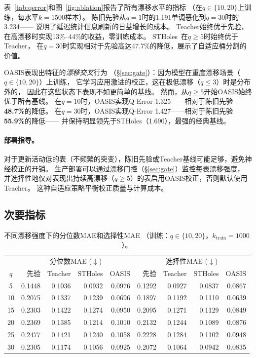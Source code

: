 \documentclass[runningheads]{llncs}
\begin{document}
表~\ref{tab:qerror}和图~\ref{fig:ablation}报告了所有漂移水平的指标
（在$q{\in}\{10,20\}$上训练，每水平$k{=}1500$样本）。
陈旧先验从$q{=}1$时的1.191单调恶化到$q{=}30$时的3.234——
说明了延迟统计信息刷新的日益增长的成本。
Teacher始终优于先验，在高漂移时实现13\%--44\%的收益，零训练成本。
STHoles~\cite{aboulnaga1999self}在$q{\geq}5$时始终优于Teacher，
在$q{=}30$时实现相对于先验高达47.7\%的降低，展示了自适应桶分割的价值。

OASIS表现出特征的\emph{漂移交叉}行为
（\S\ref{sec:gate}）：因为模型在重度漂移场景（$q{\in}\{10,20\}$）上训练，
它学习应用激进的校正，这在极低漂移（$q{\leq}3$）时是分布外的，
因此在这些状态下表现不如更简单的基线。
然而，从$q{\geq}5$开始OASIS始终优于所有基线。
在$q{=}10$时，OASIS实现Q-Error 1.325——相对于陈旧先验\textbf{48.7\%}的降低。
在$q{=}30$时，OASIS实现Q-Error 1.427——相对于陈旧先验\textbf{55.9\%}的降低——
并保持明显领先于STHoles（1.690），最强的经典基线。

\paragraph{部署指导。}
对于更新活动低的表（不频繁的突变），陈旧先验或Teacher基线可能足够，避免神经校正的开销。
生产部署可以通过漂移门控（\S\ref{sec:gate}）监控每表漂移强度，
并选择性地仅对表现出持续高漂移（$q{\geq}5$）的表启用OASIS校正，否则默认使用Teacher。
这种自适应策略平衡校正质量与计算成本。

\subsection{次要指标}
\label{sec:secondary}

\begin{table}[t]
  \centering
  \caption{不同漂移强度下的分位数MAE和选择性MAE
           （训练：$q{\in}\{10,20\}$，$k_{\text{train}}{=}1000$）。}
  \label{tab:mae}
  \begin{tabular}{c rrrr rrrr}
    \toprule
    & \multicolumn{4}{c}{分位数MAE ($\downarrow$)}
    & \multicolumn{4}{c}{选择性MAE ($\downarrow$)} \\
    \cmidrule(lr){2-5}\cmidrule(lr){6-9}
    $q$ & 先验 & Teacher & STHoles & OASIS & 先验 & Teacher & STHoles & OASIS \\
    \midrule
    5  & 0.1448 & 0.1036 & 0.0932 & 0.0976 & 0.1292 & 0.0927 & 0.0837 & 0.0867 \\
    10 & 0.2075 & 0.1337 & 0.1239 & 0.0696 & 0.1897 & 0.1192 & 0.1110 & 0.0639 \\
    15 & 0.2303 & 0.1422 & 0.1274 & 0.0950 & 0.2095 & 0.1271 & 0.1129 & 0.0849 \\
    20 & 0.2369 & 0.1385 & 0.1214 & 0.1010 & 0.2132 & 0.1244 & 0.1089 & 0.0876 \\
    25 & 0.2477 & 0.1421 & 0.1240 & 0.1058 & 0.2228 & 0.1284 & 0.1102 & 0.0948 \\
    30 & 0.2305 & 0.1174 & 0.1056 & 0.0925 & 0.2072 & 0.1064 & 0.0942 & 0.0835 \\
    \bottomrule
  \end{tabular}
\end{table}
\end{document}
